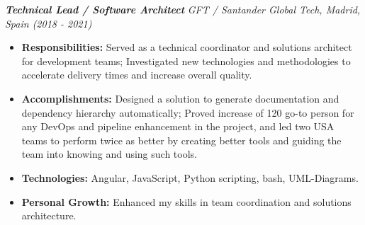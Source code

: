 \documentclass[a4paper,10pt]{article}
\newcommand{\fullwidthcolorbox}[2]{%
  \noindent\makebox[\linewidth]{%
    \colorbox{#1}{%
      \parbox{\dimexpr\paperwidth-2\fboxsep\relax}{%
        \hspace{\dimexpr\oddsidemargin+1in}%
        \begin{minipage}{\textwidth}
        #2
        \end{minipage}%
        \hspace{\dimexpr\evensidemargin+1in}%
      }%
    }%
  }%
}
\begin{document}
{\textbf{\textit{Technical Lead / Software Architect}}
\textit{\small GFT / Santander Global Tech, Madrid, Spain (2018 - 2021)}
\vspace{0.3cm}
\begin{itemize}[leftmargin=*]
    \item \textbf{Responsibilities:} Served as a technical coordinator and solutions architect for development teams;
    Investigated new technologies and methodologies to accelerate delivery times and increase overall
    quality.
    \item \textbf{Accomplishments:} Designed a solution to generate documentation and dependency hierarchy
    automatically; Proved increase of 120%
    go-to person for any DevOps and pipeline enhancement in the project, and led two USA teams to
    perform twice as better by creating better tools and guiding the team into knowing and using such
    tools.
    \item \textbf{Technologies:} Angular, JavaScript, Python scripting, bash, UML-Diagrams.
    \item \textbf{Personal Growth:} Enhanced my skills in team coordination and solutions architecture.
\end{itemize}
\vspace{0.5cm}
}%
\end{document}
